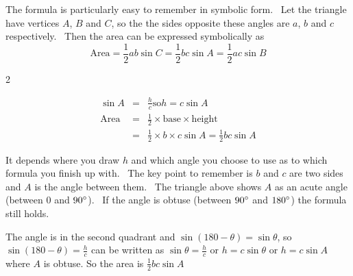 The formula is particularly easy to remember in symbolic form. \ Let
the triangle have vertices $A$, $B$ and $C$, so the the sides opposite these angles are $a$, $b$ and $c$ respectively. \ Then the area can be expressed symbolically as
\begin{equation*}\text{Area} =\frac{1}{2} a b \sin  C =\frac{1}{2} b c \sin  A =\frac{1}{2} a c \sin  B
\end{equation*}


\columnsep =30pt
\begin {multicols}{2}
 

   
\setlength\fboxrule{0in}\setlength\fboxsep{0.2in}



\begin{align*}\sin  A &  = & \frac{h}{c}\text{so}h =c \sin  A \\
\text{Area} &  = & \frac{1}{2} \times \text{base} \times \text{height} \\
 &  = & \frac{1}{2} \times b \times c \sin  A =\frac{1}{2} b c \sin  A\end{align*}


\end {multicols}


It depends where you draw $h$ and which angle you choose to use as to which formula you finish up with. \ The key
point to remember is $b$ and $c$ are two sides and $A$ is the angle between them. \ The triangle above shows $A$ as an acute angle (between $0$ and $90 \mbox{{\ensuremath{{}^\circ}}}$). \ If the angle is obtuse (between $90 \mbox{{\ensuremath{{}^\circ}}}$ and $180 \mbox{{\ensuremath{{}^\circ}}}$) the formula still holds. 

   
\setlength\fboxrule{0in}\setlength\fboxsep{0.2in}


The angle is in the second quadrant and $\sin  (180 -\theta ) =\sin  \theta $, so $\sin  (180 -\theta ) =\frac{h}{c}$ can be written as $\sin  \theta  =\frac{h}{c}$ or $h =c \sin  \theta $ or $h =c \sin  A$ where $A$ is obtuse. So the area is $\frac{1}{2} b c \sin  A$ 

